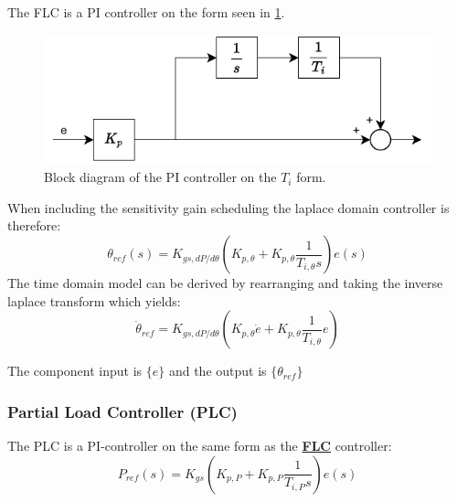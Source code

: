 The FLC is a PI controller on the form seen in \cref{fig:PIcontroller}.
\begin{figure}[ht]
	\centering
	\includegraphics[width=0.5\linewidth]{Graphics/PiController.pdf}
	\caption{Block diagram of the PI controller on the \textit{$T_i$} form.}
	\label{fig:PIcontroller}
\end{figure}
When including the sensitivity gain scheduling the laplace domain controller is therefore:
\begin{equation}\label{eq:comp_flc}
	\theta_{ref}(s) = K_{gs,dP/d\theta} (K_{p, \theta} + K_{p, \theta} \dfrac{1}{T_{i, \theta} s}) e(s)
\end{equation}
The time domain model can be derived by rearranging and taking the inverse laplace transform which yields:
\begin{equation}\label{eq:comp_flc_time}
	\dot{\theta}_{ref} = K_{gs,dP/d\theta} (K_{p, \theta} \dot{e} + K_{p, \theta} \dfrac{1}{T_{i, \theta}} e)
\end{equation}


The component input is $ \{e \} $ and the output is $ \{\theta_{ref} \} $


\subsubsection{Partial Load Controller (PLC)} \label{sec:comp_plc}
The PLC is a PI-controller on the same form as the \hyperref[sec:comp_flc]{\textbf{FLC}} controller:
\begin{equation}\label{eq:comp_plc}
	P_{ref}(s) = K_{gs} (K_{p, P} + K_{p, P} \dfrac{1}{T_{i, P} s}) e(s)
\end{equation}

